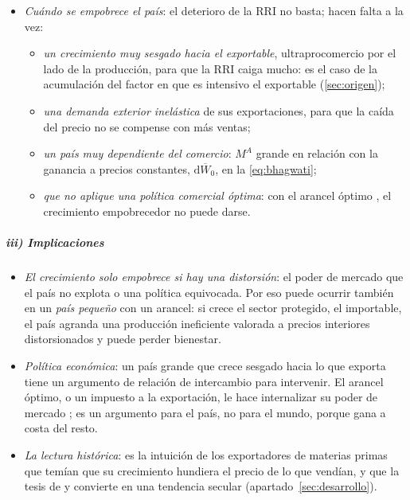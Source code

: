 \documentclass[11pt]{article}
\begin{document}
\begin{itemize}
\item \emph{Cuándo se empobrece el país}\nocite{Bhagwati1958Immiserizing}: el deterioro de la RRI no basta; hacen falta a la vez:
  \begin{itemize}
  \item \emph{un crecimiento muy sesgado hacia el exportable}, ultraprocomercio por el lado de la producción, para que la RRI caiga mucho: es el caso de la acumulación del factor en que es intensivo el exportable (\ref{sec:origen});
  \item \emph{una demanda exterior inelástica} de sus exportaciones, para que la caída del precio no se compense con más ventas;
  \item \emph{un país muy dependiente del comercio}: $M^A$ grande en relación con la ganancia a precios constantes, $\mathrm{d}\overline W_0$, en la \eqref{eq:bhagwati};
  \item \emph{que no aplique una política comercial óptima}: con el arancel óptimo , el crecimiento empobrecedor no puede darse\nocite{Bhagwati1968Distortions}.
  \end{itemize}
\end{itemize}

\subparagraph{iii) Implicaciones}

\begin{itemize}
\item \emph{El crecimiento solo empobrece si hay una distorsión}: el poder de mercado que el país no explota o una política equivocada\nocite{Bhagwati1968Distortions}. Por eso puede ocurrir también en un \emph{país pequeño} con un arancel: si crece el sector protegido, el importable, el país agranda una producción ineficiente valorada a precios interiores distorsionados y puede perder bienestar\nocite{Johnson1967Possibility}.
\item \emph{Política económica}: un país grande que crece sesgado hacia lo que exporta tiene un argumento de relación de intercambio para intervenir. El arancel óptimo, o un impuesto a la exportación, le hace internalizar su poder de mercado ; es un argumento para el país, no para el mundo, porque gana a costa del resto.
\item \emph{La lectura histórica}: es la intuición de los exportadores de materias primas que temían que su crecimiento hundiera el precio de lo que vendían, y que la tesis de  y  convierte en una tendencia secular (apartado~\ref{sec:desarrollo}).
\end{itemize}
\end{document}
